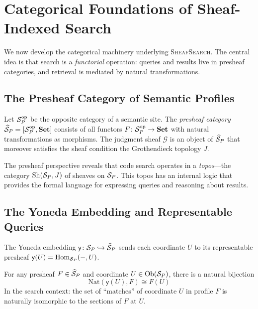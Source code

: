 \documentclass[11pt]{article}
\newcommand{\CodeSearch}{\textsc{SheafSearch}}
\newcommand{\Presh}{\widehat{\Site}}                 %
\newcommand{\yo}{\mathsf{y}}                         %
\newcommand{\Hom}{\mathrm{Hom}}                     %
\newcommand{\Nat}{\mathrm{Nat}}                     %
\newcommand{\Sh}{\mathrm{Sh}}                       %
\begin{document}
\section{Categorical Foundations of Sheaf-Indexed Search}\label{sec:categorical}

We now develop the categorical machinery underlying \CodeSearch.  The
central idea is that search is a \emph{functorial} operation: queries
and results live in presheaf categories, and retrieval is mediated by
natural transformations.

\subsection{The Presheaf Category of Semantic Profiles}

\begin{definition}\label{def:presheaf-profiles}
Let $\mathcal{S}_P^{\mathrm{op}}$ be the opposite category of a semantic site.
The \emph{presheaf category} $\Presh_P = [\Site_P^{\mathrm{op}},
\mathbf{Set}]$ consists of all functors $F \colon \mathcal{S}_P^{\mathrm{op}}
\to \mathbf{Set}$ with natural transformations as morphisms.  The
judgment sheaf $\mathcal{G}$ is an object of $\Presh_P$ that moreover
satisfies the sheaf condition \wrt the Grothendieck topology $J$.
\end{definition}

The presheaf perspective reveals that code search operates in a
\emph{topos}---the category $\Sh(\Site_P, J)$ of sheaves on $\mathcal{S}_P$.
This topos has an internal logic that provides the formal language for
expressing queries and reasoning about results.

\subsection{The Yoneda Embedding and Representable Queries}

The Yoneda embedding $\yo \colon \Site_P \hookrightarrow \Presh_P$
sends each coordinate $U$ to its representable presheaf
$\yo(U) = \Hom_{\Site_P}(-, U)$.

\begin{theorem}\label{thm:yoneda-search}
For any presheaf $F \in \Presh_P$ and coordinate $U \in \mathrm{Ob}(\mathcal{S}_P)$,
there is a natural bijection
\[
  \Nat(\yo(U), F) \cong F(U)
\]
In the search context: the set of ``matches'' of coordinate $U$ in
profile $F$ is naturally isomorphic to the sections of $F$ at $U$.
\end{theorem}
\end{document}

